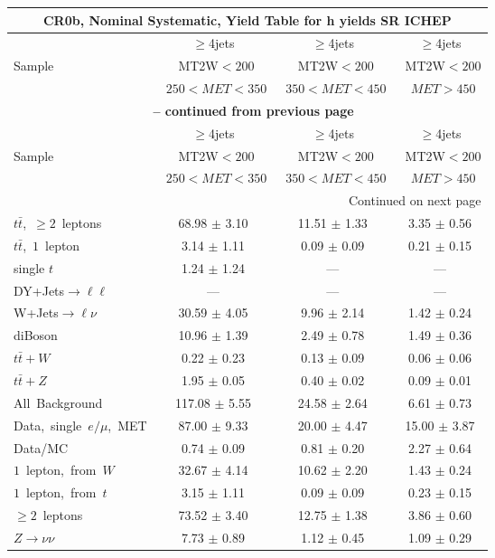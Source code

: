 \documentclass{article}
\begin{document}
\begin{longtable}{|l|c|c|c|} 
 
\multicolumn{4}{c}{ CR0b, Nominal Systematic, Yield Table for h yields SR ICHEP }\\* \hline 
  & $\ge$4jets  & $\ge$4jets  & $\ge$4jets \\* 
Sample  & ~MT2W$<200$  & ~MT2W$<200$  & ~MT2W$<200$ \\* 
  & ~$250<MET<350$  & ~$350<MET<450$  & ~$MET>450$ \\* 
\hline \hline 
\endfirsthead 
 
\multicolumn{4}{c}{{\bfseries \tablename\ \thetable{} -- continued from previous page}}\\* \hline 
  & $\ge$4jets  & $\ge$4jets  & $\ge$4jets \\* 
Sample  & ~MT2W$<200$  & ~MT2W$<200$  & ~MT2W$<200$ \\* 
  & ~$250<MET<350$  & ~$350<MET<450$  & ~$MET>450$ \\* 
\hline \hline 
\endhead 
 
\multicolumn{4}{|r|}{{Continued on next page}}\\* \hline 
\endfoot 
 
 
\endlastfoot 
 
$t\bar{t}$,~$\ge2$~leptons & 68.98 $\pm$ 3.10  & 11.51 $\pm$ 1.33  & 3.35 $\pm$ 0.56 \\* 
$t\bar{t}$,~$1$~lepton & 3.14 $\pm$ 1.11  & 0.09 $\pm$ 0.09  & 0.21 $\pm$ 0.15 \\* 
single $t$  & 1.24 $\pm$ 1.24  & ---  & --- \\* 
DY+Jets$\rightarrow\ell\ell$  & ---  & ---  & --- \\* 
W+Jets$\rightarrow\ell\nu$  & 30.59 $\pm$ 4.05  & 9.96 $\pm$ 2.14  & 1.42 $\pm$ 0.24 \\* 
diBoson  & 10.96 $\pm$ 1.39  & 2.49 $\pm$ 0.78  & 1.49 $\pm$ 0.36 \\* 
$t\bar{t}+W$  & 0.22 $\pm$ 0.23  & 0.13 $\pm$ 0.09  & 0.06 $\pm$ 0.06 \\* 
$t\bar{t}+Z$  & 1.95 $\pm$ 0.05  & 0.40 $\pm$ 0.02  & 0.09 $\pm$ 0.01 \\* 
\hline \hline 
All~Background  & 117.08 $\pm$ 5.55  & 24.58 $\pm$ 2.64  & 6.61 $\pm$ 0.73 \\* 
Data,~single~$e/\mu$,~MET  & 87.00 $\pm$ 9.33  & 20.00 $\pm$ 4.47  & 15.00 $\pm$ 3.87 \\* 
Data/MC  & 0.74 $\pm$ 0.09  & 0.81 $\pm$ 0.20  & 2.27 $\pm$ 0.64 \\* 
\hline \hline 
$1$~lepton,~from~$W$  & 32.67 $\pm$ 4.14  & 10.62 $\pm$ 2.20  & 1.43 $\pm$ 0.24 \\* 
$1$~lepton,~from~$t$  & 3.15 $\pm$ 1.11  & 0.09 $\pm$ 0.09  & 0.23 $\pm$ 0.15 \\* 
$\ge2$~leptons  & 73.52 $\pm$ 3.40  & 12.75 $\pm$ 1.38  & 3.86 $\pm$ 0.60 \\* 
$Z\rightarrow\nu\nu$  & 7.73 $\pm$ 0.89  & 1.12 $\pm$ 0.45  & 1.09 $\pm$ 0.29 \\* 
\hline 
\end{longtable} 
\end{document}
